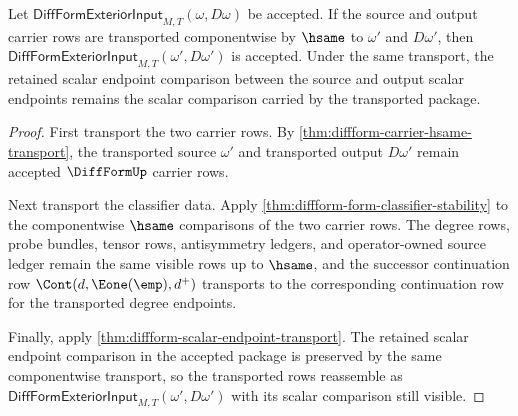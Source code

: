 \begin{theorem}
\label{thm:diffform-exterior-derivative-input-classifier-stability}
Let $\mathsf{DiffFormExteriorInput}_{M,T}(\omega,D\omega)$ be accepted. If
the source and output carrier rows are transported componentwise by $\hsame$
to $\omega'$ and $D\omega'$, then
$\mathsf{DiffFormExteriorInput}_{M,T}(\omega',D\omega')$ is accepted. Under
the same transport, the retained scalar endpoint comparison between the
source and output scalar endpoints remains the scalar comparison carried by
the transported package.
\end{theorem}
\begin{proof}
First transport the two carrier rows. By
\autoref{thm:diffform-carrier-hsame-transport}, the transported source
$\omega'$ and transported output $D\omega'$ remain accepted
$\DiffFormUp$ carrier rows.

Next transport the classifier data. Apply
\autoref{thm:diffform-form-classifier-stability} to the componentwise
$\hsame$ comparisons of the two carrier rows. The degree rows, probe bundles,
tensor rows, antisymmetry ledgers, and operator-owned source ledger remain the
same visible rows up to $\hsame$, and the successor continuation row
$\Cont(d,\Eone(\emp),d^+)$ transports to the corresponding continuation row
for the transported degree endpoints.

Finally, apply \autoref{thm:diffform-scalar-endpoint-transport}. The retained
scalar endpoint comparison in the accepted package is preserved by the same
componentwise transport, so the transported rows reassemble as
$\mathsf{DiffFormExteriorInput}_{M,T}(\omega',D\omega')$ with its scalar
comparison still visible.
\end{proof}
